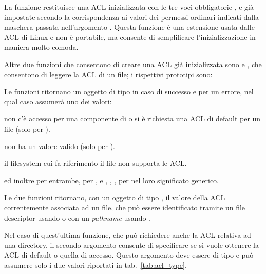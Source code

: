 La funzione restituisce una ACL inizializzata con le tre voci obbligatorie
,  e  già
impostate secondo la corrispondenza ai valori dei permessi ordinari indicati
dalla maschera passata nell'argomento . Questa funzione è una
estensione usata dalle ACL di Linux e non è portabile, ma consente di
semplificare l'inizializzazione in maniera molto comoda. 

Altre due funzioni che consentono di creare una ACL già inizializzata sono
 e , che consentono di leggere la
ACL di un file; i rispettivi prototipi sono:

\begin{funcproto}{
}

{Le funzioni ritornano un oggetto di tipo  in caso di successo e
   per un errore, nel qual caso  assumerà uno dei valori:
  \begin{errlist}
  \item[\errcode{EACCESS}] non c'è accesso per una componente di
     o si è richiesta una ACL di default per un file (solo per
    ).
  \item[\errcode{EINVAL}]  non ha un valore valido (solo per
    ).
  \item[\errcode{ENOTSUP}] il filesystem cui fa riferimento il file non
    supporta le ACL.
  \end{errlist}
  ed inoltre  per entrambe,  per
  , e , ,
  , per  nel loro significato generico. }
\end{funcproto}

Le due funzioni ritornano, con un oggetto di tipo , il valore
della ACL correntemente associata ad un file, che può essere identificato
tramite un file descriptor usando  o con un
\textit{pathname} usando .

Nel caso di quest'ultima funzione, che può richiedere anche la ACL relativa ad
una directory, il secondo argomento  consente di specificare se si
vuole ottenere la ACL di default o quella di accesso. Questo argomento deve
essere di tipo  e può assumere solo i due valori riportati
in tab.~\ref{tab:acl_type}.

